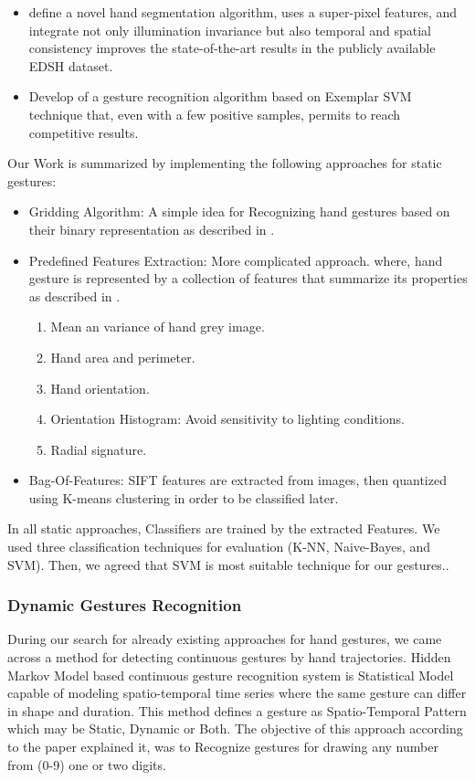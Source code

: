 \begin{itemize}
\item define a novel hand segmentation algorithm, uses a super-pixel features, and integrate not only illumination invariance but also temporal and spatial consistency improves the state-of-the-art results in the publicly available EDSH dataset.
\item Develop of a gesture recognition algorithm based on Exemplar SVM technique that, even with a few positive samples, permits to reach competitive results.
\end{itemize}
\bigskip

Our Work is summarized by implementing the following approaches for static gestures:
\begin{itemize}
\item Gridding Algorithm: A simple idea for Recognizing hand gestures based on their binary representation as described in \cite{paper1sb}.
\bigskip

\item Predefined Features Extraction: More complicated approach. where, hand gesture is represented by a collection of features that summarize its properties as described in \cite{paper2sT}.
\begin{enumerate}
\item Mean an variance of hand grey image.
\item Hand area and perimeter.
\item Hand orientation.
\item Orientation Histogram: Avoid sensitivity to lighting conditions. 
\item Radial signature.
\end{enumerate}
\bigskip

\item Bag-Of-Features: SIFT features are extracted from images, then quantized using K-means clustering in order to be classified later.
\end{itemize}
\bigskip

In all static approaches, Classifiers are trained by the extracted Features. 
We used three classification techniques for evaluation (K-NN, Naive-Bayes, and SVM). Then, we agreed that SVM is most suitable technique for our gestures..

\subsubsection{Dynamic Gestures Recognition} 
During our search for already existing approaches for hand gestures, we came across a method 
for detecting continuous gestures by hand trajectories. Hidden Markov Model based \cite{hoda} 
continuous gesture recognition system is Statistical Model capable of modeling spatio-temporal 
time series where the same gesture can differ in shape and duration. This method defines a 
gesture as Spatio-Temporal Pattern which may be Static, Dynamic or Both. The objective of 
this approach according to the paper explained it, was to Recognize gestures for drawing any 
number from (0-9) one or two digits.
\bigskip

